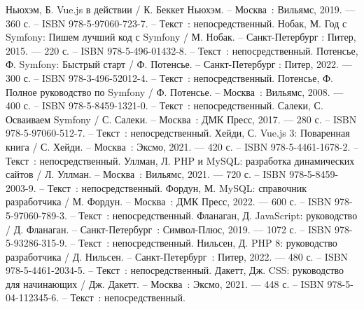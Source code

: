 
\begin{thebibliography}{9}

     Ньюхэм, Б. Vue.js в действии / К. Беккет Ньюхэм. – Москва~: Вильямс, 2019. — 360 с. – ISBN 978-5-97060-723-7. – Текст~: непосредственный.
     Нобак, М. Год с Symfony: Пишем лучший код с Symfony / М. Нобак. – Санкт-Петербург : Питер, 2015. — 220 с. – ISBN 978-5-496-01432-8. – Текст~: непосредственный.
     Потенсье, Ф. Symfony: Быстрый старт / Ф. Потенсье. – Санкт-Петербург : Питер, 2022. — 300 с. – ISBN 978-3-496-52012-4. – Текст~: непосредственный.
    	Потенсье, Ф. Полное руководство по Symfony / Ф. Потенсье. – Москва~: Вильямс, 2008. — 400 с. – ISBN 978-5-8459-1321-0. – Текст~: непосредственный.
		Салеки, С. Осваиваем Symfony / С. Салеки. – Москва~: ДМК Пресс, 2017. — 280 с. – ISBN 978-5-97060-512-7. – Текст~: непосредственный.
	 Хейди, С. Vue.js 3: Поваренная книга / С. Хейди. – Москва~: Эксмо, 2021. — 420 с. – ISBN 978-5-4461-1678-2. – Текст~: непосредственный.
	 Уллман, Л. PHP и MySQL: разработка динамических сайтов / Л. Уллман. – Москва~: Вильямс, 2021. — 720 с. – ISBN 978-5-8459-2003-9. – Текст~: непосредственный.
	 Фордун, М. MySQL: справочник разработчика / М. Фордун. – Москва~: ДМК Пресс, 2022. — 600 с. – ISBN 978-5-97060-789-3. – Текст~: непосредственный.
	 Фланаган, Д. JavaScript: руководство / Д. Фланаган. – Санкт-Петербург~: Символ-Плюс, 2019. — 1072 с. – ISBN 978-5-93286-315-9. – Текст~: непосредственный.
	 Нильсен, Д. PHP 8: руководство разработчика / Д. Нильсен. – Санкт-Петербург~: Питер, 2022. — 480 с. – ISBN 978-5-4461-2034-5. – Текст~: непосредственный.
	 Дакетт, Дж. CSS: руководство для начинающих / Дж. Дакетт. – Москва~: Эксмо, 2021. — 448 с. – ISBN 978-5-04-112345-6. – Текст~: непосредственный.
\end{thebibliography}
